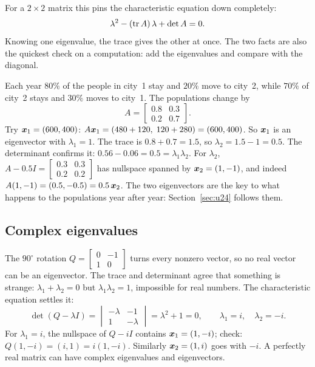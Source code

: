 For a $2\times 2$ matrix this pins the characteristic equation down completely:
\[
  \lambda^{2}-(\operatorname{tr} A)\,\lambda+\det A=0 .
\]
Knowing one eigenvalue, the trace gives the other at once. The two facts are also the
quickest check on a computation: add the eigenvalues and compare with the diagonal.

\begin{example}\label{ex:u23-markov}
Each year $80\%$ of the people in city~1 stay and $20\%$ move to city~2, while $70\%$ of
city~2 stays and $30\%$ moves to city~1. The populations change by
\[
  A=\begin{bmatrix} 0.8&0.3\\ 0.2&0.7\end{bmatrix}.
\]
Try $\boldsymbol{x}_1=(600,400)$:
$A\boldsymbol{x}_1=(480+120,\;120+280)=(600,400)$. So $\boldsymbol{x}_1$ is an eigenvector with
$\lambda_1=1$. The trace is $0.8+0.7=1.5$, so $\lambda_2=1.5-1=0.5$. The determinant
confirms it: $0.56-0.06=0.5=\lambda_1\lambda_2$. For $\lambda_2$,
$A-0.5I=\left[\begin{smallmatrix} 0.3&0.3\\ 0.2&0.2\end{smallmatrix}\right]$ has nullspace
spanned by $\boldsymbol{x}_2=(1,-1)$, and indeed $A(1,-1)=(0.5,-0.5)=0.5\,\boldsymbol{x}_2$. The two
eigenvectors are the key to what happens to the populations year after year:
Section~\ref{sec:u24} follows them.
\end{example}

\subsection{Complex eigenvalues}

The $90^{\circ}$ rotation $Q=\begin{bmatrix} 0&-1\\ 1&0\end{bmatrix}$ turns every nonzero
vector, so no real vector can be an eigenvector. The trace and determinant agree that
something is strange: $\lambda_1+\lambda_2=0$ but $\lambda_1\lambda_2=1$, impossible for
real numbers. The characteristic equation settles it:
\[
  \det(Q-\lambda I)=\begin{vmatrix} -\lambda & -1\\ 1 & -\lambda\end{vmatrix}=\lambda^{2}+1=0,
  \qquad \lambda_1=i,\quad \lambda_2=-i .
\]
For $\lambda_1=i$, the nullspace of $Q-iI$ contains $\boldsymbol{x}_1=(1,-i)$; check:
$Q(1,-i)=(i,1)=i(1,-i)$. Similarly $\boldsymbol{x}_2=(1,i)$ goes with $-i$. A perfectly real matrix
can have complex eigenvalues and eigenvectors.

